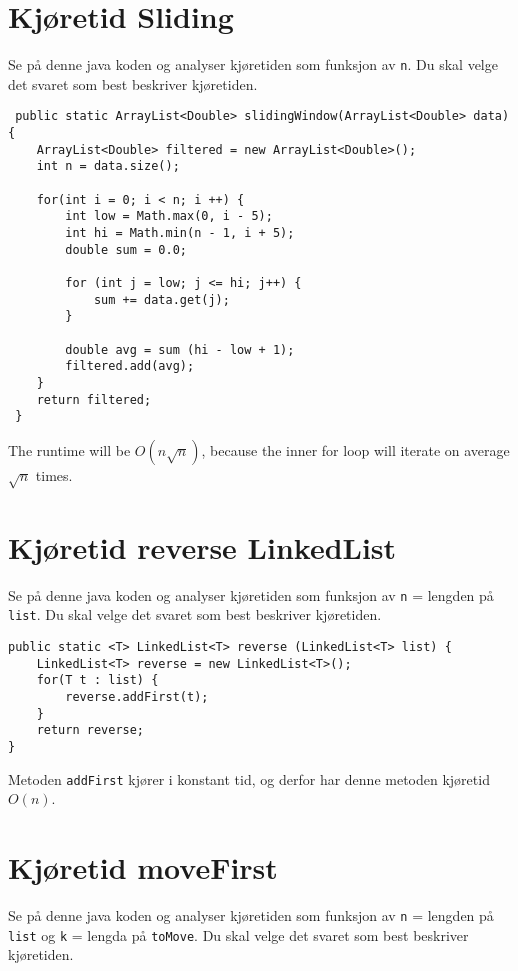 \documentclass{article}
\begin{document}
    \section{Kjøretid Sliding}

    Se på denne java koden og analyser kjøretiden som funksjon av \texttt{n}. Du skal velge det svaret som best beskriver kjøretiden.

    \begin{lstlisting}
 public static ArrayList<Double> slidingWindow(ArrayList<Double> data) {
    ArrayList<Double> filtered = new ArrayList<Double>();
    int n = data.size();

    for(int i = 0; i < n; i ++) {
        int low = Math.max(0, i - 5);
        int hi = Math.min(n - 1, i + 5);
        double sum = 0.0;
        
        for (int j = low; j <= hi; j++) {
            sum += data.get(j);
        }

        double avg = sum (hi - low + 1);
        filtered.add(avg);
    }
    return filtered;
 }
    \end{lstlisting}

    \begin{ans}
        The runtime will be \( O\left( n \sqrt{n} \right) \), because the inner for loop will iterate on average \( \sqrt{n} \) times.
    \end{ans}

\section{Kjøretid reverse LinkedList}
Se på denne java koden og analyser kjøretiden som funksjon av \texttt{n} = lengden på \texttt{list}. Du skal velge det svaret som best beskriver kjøretiden.

\begin{lstlisting}
public static <T> LinkedList<T> reverse (LinkedList<T> list) {
    LinkedList<T> reverse = new LinkedList<T>();
    for(T t : list) {
        reverse.addFirst(t);
    }
    return reverse;
}
\end{lstlisting}

\begin{ans}
    Metoden \texttt{addFirst} kjører i konstant tid, og derfor har denne metoden kjøretid \( O(n) \).
\end{ans}

\section{Kjøretid moveFirst}
Se på denne java koden og analyser kjøretiden som funksjon av \texttt{n} = lengden på \texttt{list} og \texttt{k} = lengda på \texttt{toMove}. Du skal velge det svaret som best beskriver kjøretiden.
\end{document}
